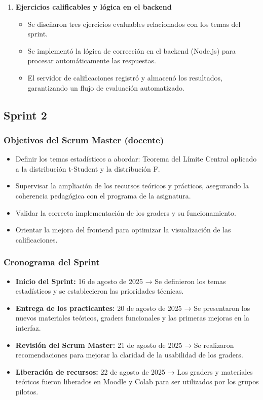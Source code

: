 \documentclass[letter,oneside,12pt,spanish]{report}
\begin{document}
\begin{enumerate}
	\item \textbf{Ejercicios calificables y lógica en el backend}
	\begin{itemize}
		\item Se diseñaron tres ejercicios evaluables relacionados con los temas del sprint.
		\item Se implementó la lógica de corrección en el backend (Node.js) para procesar automáticamente las respuestas.
		\item El servidor de calificaciones registró y almacenó los resultados, garantizando un flujo de evaluación automatizado.
	\end{itemize}
\end{enumerate}

\subsection{Sprint 2}

\subsubsection*{Objetivos del Scrum Master (docente)}
\begin{itemize}
	\item Definir los temas estadísticos a abordar: Teorema del Límite Central aplicado a la distribución t-Student y la distribución F.
	\item Supervisar la ampliación de los recursos teóricos y prácticos, asegurando la coherencia pedagógica con el programa de la asignatura.
	\item Validar la correcta implementación de los graders y su funcionamiento.
	\item Orientar la mejora del frontend para optimizar la visualización de las calificaciones.
\end{itemize}

\subsubsection*{Cronograma del Sprint}
\begin{itemize}
	\item \textbf{Inicio del Sprint:} 16 de agosto de 2025 → Se definieron los temas estadísticos y se establecieron las prioridades técnicas.
	\item \textbf{Entrega de los practicantes:} 20 de agosto de 2025 → Se presentaron los nuevos materiales teóricos, graders funcionales y las primeras mejoras en la interfaz.
	\item \textbf{Revisión del Scrum Master:} 21 de agosto de 2025 → Se realizaron recomendaciones para mejorar la claridad de la usabilidad de los graders.
	\item \textbf{Liberación de recursos:} 22 de agosto de 2025 → Los graders y materiales teóricos fueron liberados en Moodle y Colab para ser utilizados por los grupos pilotos.
\end{itemize}
\end{document}
